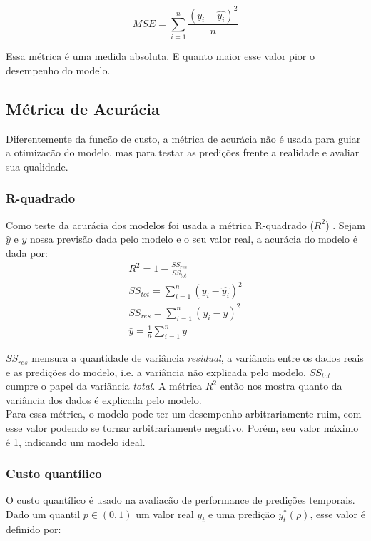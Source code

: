 \[MSE = \sum^n_{i=1}\frac{(y_i - \hat{y_i})^2}{n}\]

Essa métrica é uma medida absoluta. E quanto maior esse valor pior o desempenho
do modelo. \\


\subsection{Métrica de Acurácia}

Diferentemente da funcão de custo, a métrica de acurácia não é usada para guiar a otimizacão do modelo,
mas para testar as predições frente a realidade e avaliar sua qualidade. \\

\subsubsection{R-quadrado}
Como teste da acurácia dos modelos foi usada a métrica R-quadrado ($R^2$) \citep{cohen}. Sejam $\hat{y}$ e $y$ nossa previsão dada pelo modelo e o seu valor real, a acurácia do modelo é dada por:\\

\begin{align}
&R^2 = 1 - \frac{SS_{res}}{SS_{tot}} &\\
&SS_{tot} = \sum^n_{i=1} (y_i- \hat{y_i})^2 &\\
&SS_{res} = \sum^n_{i=1} (y_i - \bar{y})^2 &\\
&\bar{y} = \frac{1}{n} \sum^n_{i=1} y &
\end{align}

$SS_{res}$ mensura a quantidade de variância \textit{residual}, a
variância entre os dados reais e as predições do modelo, i.e. a variância não
explicada pelo modelo. $SS_{tot}$ cumpre o papel da variância \textit{total}. A métrica $R^2$
então nos mostra quanto da variância dos dados é explicada pelo modelo. \\

Para essa métrica, o modelo pode ter um desempenho arbitrariamente ruim, com esse valor
podendo se tornar arbitrariamente negativo. Porém, seu valor máximo é 1,
indicando um modelo ideal.\\


\subsubsection{Custo quantílico}

O custo quantílico é usado na avaliacão de performance de predições temporais. \\
Dado um quantil $p \in (0,1)$ um valor real $y_{t}$ e uma predição $y^{*}_{t}(\rho)$, esse valor é definido por: \\

